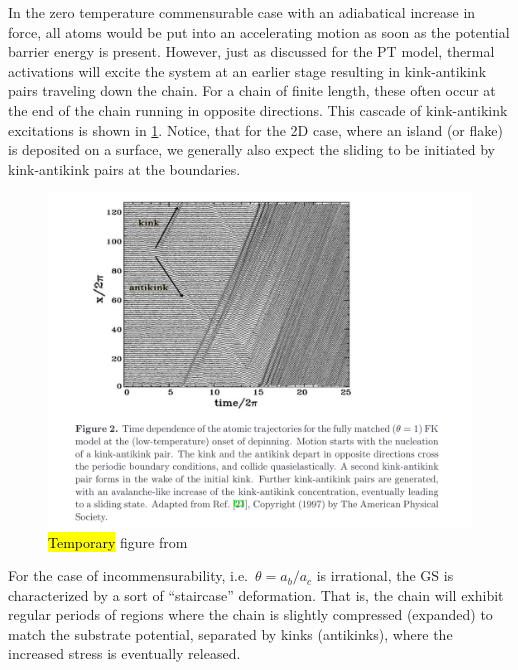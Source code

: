 In the zero temperature commensurable case with an adiabatical increase in force, all atoms would be put into an accelerating motion as soon as the potential barrier energy is present. However, just as discussed for the \acrshort{PT} model, thermal activations will excite the system at an earlier stage resulting in kink-antikink pairs traveling down the chain. For a chain of finite length, these often occur at the end of the chain running in opposite directions. This cascade of kink-antikink excitations is shown in \cref{fig:kink_antikink}. Notice, that for the 2D case, where an island (or flake) is deposited on a surface, we generally also expect the sliding to be initiated by kink-antikink pairs at the boundaries. 

\begin{figure}[H]
  \centering
  \includegraphics[width=0.8\linewidth]{figures/theory/kink_antikink.png}
  \caption{\hl{Temporary} figure from \cite{Manini_2016}}
  \label{fig:kink_antikink}
\end{figure}


For the case of incommensurability, i.e.\ $\theta = a_b/a_c$ is irrational, the
\acrshort{GS} is characterized by a sort of ``staircase''  deformation. That is, the chain will exhibit regular periods of regions where the chain is slightly compressed (expanded) to match the substrate potential, separated by kinks (antikinks), where the increased stress is eventually released.



